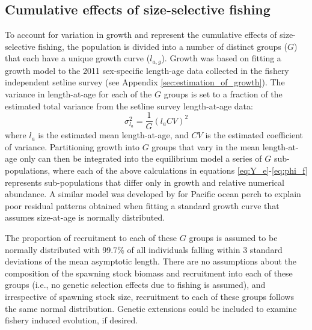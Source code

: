 \subsection*{Cumulative effects of size-selective fishing} %
\label{sub:cumulative_effects_of_size_selective_fishing}
To account for variation in growth and represent the cumulative effects of size-selective fishing, the population is divided into a number of distinct groups ($G$) that each have a unique growth curve ($l_{a,g}$).  Growth was based on fitting a growth model to the 2011 sex-specific length-age data collected in the fishery independent setline survey (see Appendix \ref{sec:estimation_of_growth}). The variance in length-at-age for each of the $G$ groups is set to a fraction of the estimated total variance from  the setline survey length-at-age data:
\[
 \sigma_{l_a}^2 = \frac{1}{G} (l_a CV)^2
\]
where $l_a$ is the estimated mean length-at-age, and $CV$ is the estimated coefficient of variance.  Partitioning growth  into $G$  groups that vary in the mean length-at-age only can then be integrated into the equilibrium model a series of $G$ sub-populations, where each of the above calculations in equations \eqref{eq:Y_e}-\eqref{eq:phi_f} represents sub-populations that differ only in growth and relative numerical abundance. A similar model was developed by \cite{mulligan1992length} for Pacific ocean perch to explain poor residual patterns obtained when fitting a standard growth curve that assumes size-at-age is normally distributed.

The proportion of recruitment to each of these $G$ groups is assumed to be normally distributed with 99.7\% of all individuals falling within 3 standard deviations of the mean asymptotic length.  There are no assumptions about the composition of the spawning stock biomass and recruitment into each of these groups (i.e., no genetic selection effects due to fishing is assumed), and irrespective of spawning stock size, recruitment to each of these groups follows the same normal distribution.  Genetic extensions could be included to examine fishery induced evolution, if desired.


